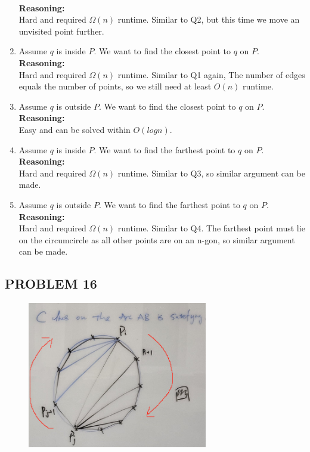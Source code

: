 \documentclass{article}
\begin{document}
\begin{enumerate}
    \\
    \textbf{Reasoning: }
    \\
    Hard and required $\Omega(n)$ runtime. Similar to Q2, but this time we move an unvisited point further.
    \item Assume $q$ is inside $P$. We want to find the closest point to $q$ on $P$.
    \\
    \textbf{Reasoning: }
    \\
    Hard and required $\Omega(n)$ runtime. Similar to Q1 again, The number of edges equals the number of points, so we still need at least $O(n)$ runtime.
    \item Assume $q$ is outside $P$. We want to find the closest point to $q$ on $P$.
    \\
    \textbf{Reasoning: }
    \\
    Easy and can be solved within $O(logn)$. 
    \item Assume $q$ is inside $P$. We want to find the farthest point to $q$ on $P$.
    \\
    \textbf{Reasoning: }
    \\
    Hard and required $\Omega(n)$ runtime. Similar to Q3, so similar argument can be made.
    \item Assume $q$ is outside $P$. We want to find the farthest point to $q$ on $P$.
    \\
    \textbf{Reasoning: }
    \\
    Hard and required $\Omega(n)$ runtime. Similar to Q4. The farthest point must lie on the circumcircle as all other points are on an n-gon, so similar argument can be made.
\end{enumerate}

\newpage

\subsection*{PROBLEM 16}

\begin{figure}[h]
    \centering
    \includegraphics[width=0.7\textwidth]{HW5_Q2.png}
    \label{fig:q2PROOF}
\end{figure}
\end{document}
